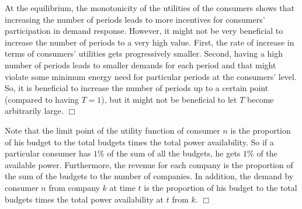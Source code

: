 \begin{remark} At the equilibrium, the monotonicity of the utilities of the consumers shows that increasing the number of periods leads to more incentives for consumers' participation in demand response. However, it might not be very beneficial to increase the number of periods to a very high value. First, the rate of increase in terms of consumers' utilities gets progressively smaller. Second, having a high number of periods leads to smaller demands for each period and that might violate some minimum energy need for particular periods at the consumers' level. So, it is beneficial to increase the number of periods up to a certain point (compared to having $T=1$), but it might not be beneficial to let $T$ become arbitrarily large. 
\hfill$\Box$
\end{remark}


\begin{remark} Note that the limit point of the utility function of consumer $n$ is the proportion of his budget to the total budgets times the total power availability. So if a particular consumer has $1\%$ of the sum of all the budgets, he gets $1\%$ of the available power. Furthermore, the revenue for each company is the proportion of the sum of the budgets to the number of companies. In addition, the demand by consumer $n$ from company $k$ at time $t$ is the proportion of his budget to the total budgets times the total power availability at $t$ from $k$.
\hfill$\Box$
\end{remark}



